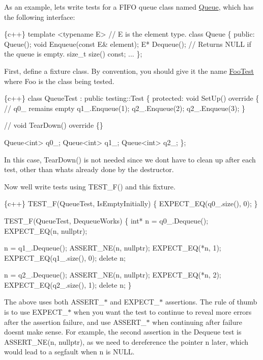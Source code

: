 As an example, let\textquotesingle{}s write tests for a F\+I\+FO queue class named {\ttfamily \mbox{\hyperlink{classQueue}{Queue}}}, which has the following interface\+:


\begin{DoxyCode}
\{c++\}
template <typename E>  // E is the element type.
class Queue \{
 public:
  Queue();
  void Enqueue(const E& element);
  E* Dequeue();  // Returns NULL if the queue is empty.
  size\_t size() const;
  ...
\};
\end{DoxyCode}


First, define a fixture class. By convention, you should give it the name {\ttfamily \mbox{\hyperlink{classFooTest}{Foo\+Test}}} where {\ttfamily Foo} is the class being tested.


\begin{DoxyCode}
\{c++\}
class QueueTest : public testing::Test \{
 protected:
  void SetUp() override \{
     // q0\_ remains empty
     q1\_.Enqueue(1);
     q2\_.Enqueue(2);
     q2\_.Enqueue(3);
  \}

  // void TearDown() override \{\}

  Queue<int> q0\_;
  Queue<int> q1\_;
  Queue<int> q2\_;
\};
\end{DoxyCode}


In this case, {\ttfamily Tear\+Down()} is not needed since we don\textquotesingle{}t have to clean up after each test, other than what\textquotesingle{}s already done by the destructor.

Now we\textquotesingle{}ll write tests using {\ttfamily T\+E\+S\+T\+\_\+\+F()} and this fixture.


\begin{DoxyCode}
\{c++\}
TEST\_F(QueueTest, IsEmptyInitially) \{
  EXPECT\_EQ(q0\_.size(), 0);
\}

TEST\_F(QueueTest, DequeueWorks) \{
  int* n = q0\_.Dequeue();
  EXPECT\_EQ(n, nullptr);

  n = q1\_.Dequeue();
  ASSERT\_NE(n, nullptr);
  EXPECT\_EQ(*n, 1);
  EXPECT\_EQ(q1\_.size(), 0);
  delete n;

  n = q2\_.Dequeue();
  ASSERT\_NE(n, nullptr);
  EXPECT\_EQ(*n, 2);
  EXPECT\_EQ(q2\_.size(), 1);
  delete n;
\}
\end{DoxyCode}


The above uses both {\ttfamily A\+S\+S\+E\+R\+T\+\_\+$\ast$} and {\ttfamily E\+X\+P\+E\+C\+T\+\_\+$\ast$} assertions. The rule of thumb is to use {\ttfamily E\+X\+P\+E\+C\+T\+\_\+$\ast$} when you want the test to continue to reveal more errors after the assertion failure, and use {\ttfamily A\+S\+S\+E\+R\+T\+\_\+$\ast$} when continuing after failure doesn\textquotesingle{}t make sense. For example, the second assertion in the {\ttfamily Dequeue} test is {\ttfamily A\+S\+S\+E\+R\+T\+\_\+\+N\+E(n, nullptr)}, as we need to dereference the pointer {\ttfamily n} later, which would lead to a segfault when {\ttfamily n} is {\ttfamily N\+U\+LL}.

